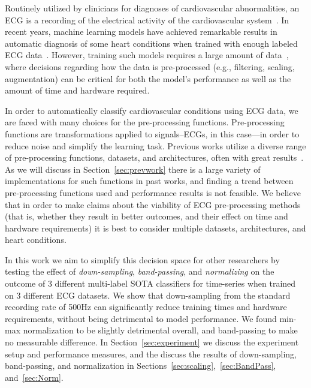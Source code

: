 \documentclass[pmlr,twocolumn]{jmlr}%
\begin{document}
Routinely utilized by clinicians for diagnoses of cardiovascular abnormalities, an ECG is a recording of the electrical activity of the cardiovascular system~\cite{uwaechia2021comprehensive}. In recent years, machine learning models have achieved remarkable results in automatic diagnosis of some heart conditions when trained with enough labeled ECG data~\cite{reyna2021will,reyna4issues,ribeiro2020automatic,chen2020detection,zhao2020adaptive}. However, training such models requires a large amount of data~\cite{reyna2021will,reyna4issues,natarajan2020wide,ribeiro2020automatic}, where decisions regarding how the data is pre-processed (e.g., filtering, scaling, augmentation) can be critical for both the model's performance as well as the amount of time and hardware required. 


In order to automatically classify cardiovascular conditions using ECG data, we are faced with many choices for the pre-processing functions. Pre-processing functions are transformations applied to signals--ECGs, in this case---in order to reduce noise and simplify the learning task. Previous works utilize a diverse range of pre-processing functions, datasets, and architectures, often with great results~\cite{hong2022practical}. As we will discuss in Section~\ref{sec:prevwork} there is a large variety of implementations for such functions in past works, and finding a trend between pre-processing functions used and performance results is not feasible. We believe that in order to make claims about the viability of ECG pre-processing methods (that is, whether they result in better outcomes, and their effect on time and hardware requirements) it is best to consider multiple datasets, architectures, and heart conditions.  


In this work we aim to simplify this decision space for other researchers by testing the effect of \textit{down-sampling}, \textit{band-passing}, and \textit{normalizing} on the outcome of 3 different multi-label SOTA classifiers for time-series when trained on 3 different ECG datasets. We show that down-sampling from the standard recording rate of 500Hz can significantly reduce training times and hardware requirements, without being detrimental to model performance.  We found min-max normalization to be slightly detrimental overall, and band-passing to make no measurable difference. In Section~\ref{sec:experiment} we discuss the experiment setup and performance measures, and the discuss the results of down-sampling, band-passing, and normalization in Sections~\ref{sec:scaling},~\ref{sec:BandPass}, and~\ref{sec:Norm}. 
\end{document}
